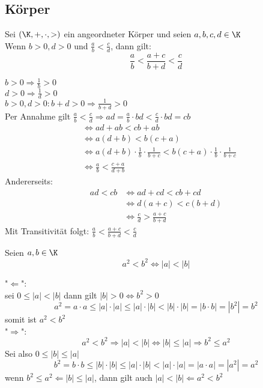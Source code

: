 \documentclass[12pt,a4paper,titlepage,draft]{article}
\begin{document}
	\subsection{Körper}
	\begin{satz}
		Sei \((\K,+,\cdot, >)\) ein angeordneter Körper und seien \(a,b,c,d \in \K\)\\
		Wenn \(b > 0, d > 0\) und \(\frac{a}{b} < \frac{c}{d}\), dann gilt:
		\[\frac{a}{b} < \frac{a+c}{b + d} < \frac{c}{d}\]
	\end{satz}
	\begin{bew}
		\(b > 0 \Rightarrow \frac{1}{b} > 0\)\\
		\(d > 0 \Rightarrow \frac{1}{d} > 0\)\\
		\(b > 0, d > 0: b+d > 0 \Rightarrow \frac{1}{b+d} > 0\)\\
		Per Annahme gilt \(\frac{a}{b} < \frac{c}{d} \Rightarrow ad = \frac{a}{b} \cdot bd < \frac{c}{d} \cdot bd = cb\)
		\begin{align*}
			&\Leftrightarrow ad + ab < cb + ab\\
			&\Leftrightarrow a(d+b) < b(c+a)\\
			&\Leftrightarrow a(d+b) \cdot \frac{1}{b} \cdot \frac{1}{b+c} < b(c+a) \cdot \frac{1}{b} \cdot \frac{1}{b+c}\\
			&\Leftrightarrow \frac{a}{b} < \frac{c+a}{d+b}
		\end{align*}
		Andererseits:
		\begin{align*}
			ad < cb &\Leftrightarrow ad + cd < cb + cd\\
			&\Leftrightarrow d(a+c) < c(b+d)\\
			&\Leftrightarrow \frac{c}{d} > \frac{a+c}{b+d}
		\end{align*}
		Mit Transitivität folgt: \(\frac{a}{b} < \frac{a+c}{b + d} < \frac{c}{d}\)
	\end{bew}
	\begin{satz}
		Seien \(a,b \in \K\)
		\[a^2 < b^2 \Leftrightarrow |a| < |b|\]
	\end{satz}
	\begin{bew}
		"\(\Leftarrow\)":\\
		sei \(0 \leq |a| < |b|\) dann gilt \(|b| > 0 \Leftrightarrow b^2 > 0\)\\
		\[a^2 = a \cdot a \leq |a| \cdot |a| \leq |a| \cdot |b| < |b| \cdot |b| = |b \cdot b| = |b^2| = b^2\]
		somit ist \(a^2 < b^2\)\\
		"\(\Rightarrow\)":\\
		\[a^2 < b^2 \Rightarrow |a| < |b| \Leftrightarrow |b| \leq |a| \Rightarrow b^2 \leq a^2\]
		Sei also \(0 \leq |b| \leq |a|\)\\
		\[b^2 = b \cdot b \leq |b| \cdot |b| \leq |a| \cdot |b| < |a| \cdot |a| = |a \cdot a| = |a^2| = a^2\]
		wenn \(b^2 \leq a^2 \Leftarrow |b| \leq |a|\), dann gilt auch \(|a| < |b| \Leftarrow a^2 < b^2\)
	\end{bew}
\end{document}
